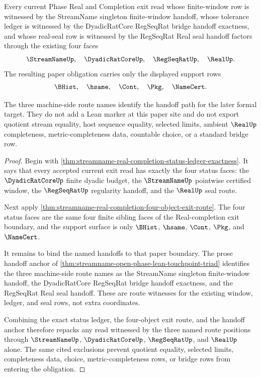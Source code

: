 \begin{theorem}
\label{thm:streamname-real-completion-three-touchpoint-handoff-route}
Every current Phase Real and Completion exit read whose finite-window row is witnessed by the StreamName singleton finite-window handoff, whose tolerance ledger is witnessed by the DyadicRatCore RegSeqRat bridge handoff exactness, and whose real-seal row is witnessed by the RegSeqRat Real seal handoff factors through the existing four faces
$$
\StreamNameUp,\quad \DyadicRatCoreUp,\quad \RegSeqRatUp,\quad \RealUp.
$$
The resulting paper obligation carries only the displayed support rows
$$
\BHist,\quad \hsame,\quad \Cont,\quad \Pkg,\quad \NameCert.
$$

The three machine-side route names identify the handoff path for the later formal target. They do not add a Lean marker at this paper site and do not export quotient stream equality, host sequence equality, selected limits, ambient $\RealUp$ completeness, metric-completeness data, countable choice, or a standard bridge row.
\end{theorem}
\begin{proof}
Begin with \autoref{thm:streamname-real-completion-status-ledger-exactness}. It says that every accepted current exit read has exactly the four status faces: the $\DyadicRatCoreUp$ finite dyadic budget, the $\StreamNameUp$ pointwise certified window, the $\RegSeqRatUp$ regularity handoff, and the $\RealUp$ seal route.

Next apply \autoref{thm:streamname-real-completion-four-object-exit-route}. The four status faces are the same four finite sibling faces of the Real-completion exit boundary, and the support surface is only $\BHist$, $\hsame$, $\Cont$, $\Pkg$, and $\NameCert$.

It remains to bind the named handoffs to that paper boundary. The prose handoff anchor of \autoref{thm:streamname-open-phase-lean-touchpoint-triad} identifies the three machine-side route names as the StreamName singleton finite-window handoff, the DyadicRatCore RegSeqRat bridge handoff exactness, and the RegSeqRat Real seal handoff. These are route witnesses for the existing window, ledger, and seal rows, not extra coordinates.

Combining the exact status ledger, the four-object exit route, and the handoff anchor therefore repacks any read witnessed by the three named route positions through $\StreamNameUp$, $\DyadicRatCoreUp$, $\RegSeqRatUp$, and $\RealUp$ alone. The same cited exclusions prevent quotient equality, selected limits, completeness data, choice, metric-completeness rows, or bridge rows from entering the obligation.
\end{proof}

